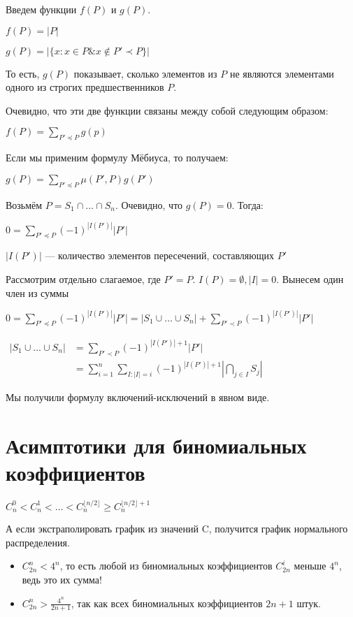 Введем функции $f(P)$ и $ g(P) $.

$f(P) = |P|$

$g(P) = |\{x: x \in P \& x \notin P'\prec P \}|$

То есть, $g(P)$ показывает, сколько элементов из $P$ не являются элементами одного из строгих предшественников $P$.

Очевидно, что эти две функции связаны между собой следующим образом:

$\displaystyle
f(P) = \sum \limits _{P' \preceq P} g(p) $


Если мы применим формулу Мёбиуса, то получаем:

$\displaystyle
g(P) = \sum \limits _{P' \preceq P} \mu(P', P) g(P')$

Возьмём $P = S_1 \cap \dots \cap S_n$. 
Очевидно, что $g(P) = 0$. Тогда:

$\displaystyle
0 = \sum \limits _{P' \preceq P} (-1)^{|I(P')|}|P'|$

$|I(P')|$ --- количество элементов пересечений, составляющих $P'$


Рассмотрим отдельно слагаемое, где $P' = P$. $I(P) = \emptyset, |I| = 0$. Вынесем один член из суммы

$\displaystyle
0 = \sum \limits _{P' \preceq P} (-1)^{|I(P')|}|P'| = |S_1 \cup \dots \cup S_n| + \sum \limits _{P' \prec P} (-1)^{|I(P')|}|P'| $

$\displaystyle 
\begin{aligned}
|S_1 \cup \dots \cup S_n| &= \sum \limits _{P' \prec P} (-1)^{|I(P')|+1}|P'| \\
 & = \sum \limits _{i=1} ^n \sum \limits _{I: |I| = i} (-1)^{|I(P')|+1}|\bigcap \limits _{j \in I} S_j|
 \end{aligned} $
 

Мы получили формулу включений-исключений в явном виде.


\section{Асимптотики для биномиальных коэффициентов}
\begin{thm}
$
C_n^0 < C_n^1 < \dots < C_n^{\lfloor  n/2\rfloor} \geq C_n^{\lfloor n/2\rfloor + 1} $
\end{thm}
\begin{rem}
А если экстраполировать график из значений C, получится график нормального распределения.
\end{rem}

\begin{thm}
\begin{itemize}
\item
$C^n_{2n} < 4^n$, то есть любой из биномиальных коэффициентов $C^i_{2n}$ меньше $4^n$, ведь это их сумма!
\item
$\displaystyle
C^n_{2n} > \frac {4^n} {2n+1}$, так как всех биномиальных коэффициентов $2n+1$ штук.
\end{itemize}
\end{thm}

